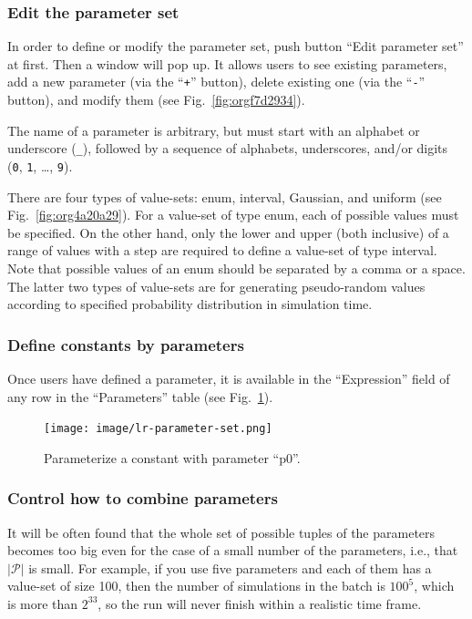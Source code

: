 \documentclass[a4paper,10pt]{report}
\begin{document}
\subsubsection{Edit the parameter set}
\label{sec:org2445e0f}
In order to define or modify the parameter set, push button ``Edit parameter
set'' at first. Then a window will pop up. It allows users to see existing
parameters, add a new parameter (via the ``\texttt{+}'' button), delete existing
one (via the ``\texttt{-}'' button), and modify them (see
Fig.~\ref{fig:orgf7d2934}).

The name of a parameter is arbitrary, but must start with an alphabet or
underscore (\texttt{\_}), followed by a sequence of alphabets, underscores, and/or
digits (\texttt{0}, \texttt{1}, \ldots{}, \texttt{9}).

There are four types of value-sets: enum, interval, Gaussian, and uniform
(see Fig.~\ref{fig:org4a20a29}).
For a value-set of type enum, each of possible values must be specified.
On the other hand, only the lower and upper (both inclusive) of a range
of values with a step are required to define a value-set of type interval.
Note that possible values of an enum should be separated by a comma or a space.
The latter two types of value-sets are for generating pseudo-random values
according to specified probability distribution in simulation time.

\subsubsection{Define constants by parameters}
\label{sec:orgd3800ee}
Once users have defined a parameter, it is available in the ``Expression'' field
of any row in the ``Parameters'' table (see Fig.~\ref{fig:orge987fbd}).

\begin{figure}[htbp]
\centering
\texttt{[image: image/lr-parameter-set.png]}
\caption{\label{fig:orge987fbd}Parameterize a constant with parameter ``p0''.}
\end{figure}

\subsubsection{\label{org2ea7fa0}Control how to combine parameters}
\label{sec:org2b934d1}
It will be often found that the whole set of possible tuples of the parameters
becomes too big even for the case of a small number of the parameters, i.e., that
\(\lvert \mathcal{P} \rvert\) is small. For example, if you use five parameters
and each of them has a value-set of size 100, then the number of simulations
in the batch is \(100^5\), which is more than \(2^{33}\), so the run will never finish
within a realistic time frame.
\end{document}
